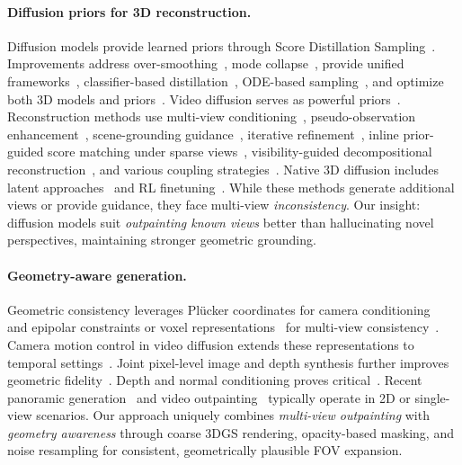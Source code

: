 \documentclass[runningheads]{llncs}
\begin{document}
\paragraph{Diffusion priors for 3D reconstruction.}
Diffusion models provide learned priors through Score Distillation Sampling~\cite{poole2022dreamfusion,wang2023prolificdreamer,liang2024luciddreamer}. Improvements address over-smoothing~\cite{lukoianov2024score}, mode collapse~\cite{wang2024taming}, provide unified frameworks~\cite{mcallister2024rethinking}, classifier-based distillation~\cite{yu2023text}, ODE-based sampling~\cite{wu2024consistent3d,lee2024dreamflow}, and optimize both 3D models and priors~\cite{yang2024learn,chen2024vividdreamer}. Video diffusion serves as powerful priors~\cite{liu2024reconx,melas20243d,yi2024gaussiandreamer}. Reconstruction methods use multi-view conditioning~\cite{wu2024reconfusion}, pseudo-observation enhancement~\cite{liu2024deceptive}, scene-grounding guidance~\cite{zhong2025taming}, iterative refinement~\cite{wu2025genfusion,wu2025difix3d+,liu20243dgs}, inline prior-guided score matching under sparse views~\cite{wang2024use}, visibility-guided decompositional reconstruction~\cite{ni2025decompositional}, and various coupling strategies~\cite{xu2024bayesian,hui2024microdiffusion,muller2024multidiff,liu2024meshformer,xue2024human}. Native 3D diffusion includes latent approaches~\cite{lan2024ln3diff,he2024gvgen,wu2024direct3d,wu2024unique3d,yang2024scenecraft} and RL finetuning~\cite{xie2024carve3d}. While these methods generate additional views or provide guidance, they face multi-view \emph{inconsistency}. Our insight: diffusion models suit \emph{outpainting known views} better than hallucinating novel perspectives, maintaining stronger geometric grounding.

\paragraph{Geometry-aware generation.}
Geometric consistency leverages Pl\"ucker coordinates for camera conditioning~\cite{xu2023dmv3d,kant2024spad,zhang2024cameras,xu2024camco,ji2025campvg,he2024cameractrl,bahmani2025vd3d} and epipolar constraints or voxel representations~\cite{tu2023imgeonet} for multi-view consistency~\cite{huang2024epidiff,ye2024diffpano,wang2024mvdd,kupyn2025epipolar,muller2024multidiff,xu20243difftection,zheng2024cami2v}. Camera motion control in video diffusion extends these representations to temporal settings~\cite{wang2024motionctrl}. Joint pixel-level image and depth synthesis further improves geometric fidelity~\cite{guizilini2025zero}. Depth and normal conditioning proves critical~\cite{lu2024direct2,long2024wonder3d,ke2024repurposing,fu2024geowizard,patni2024ecodepth,hu2024mvd,duan2024diffusiondepth,wang2024depthanywhere,qiu2024richdreamer}. Recent panoramic generation~\cite{zhang2024continuous,wang2024360dvd} and video outpainting~\cite{yu2025unboxed} typically operate in 2D or single-view scenarios. Our approach uniquely combines \emph{multi-view outpainting} with \emph{geometry awareness} through coarse 3DGS rendering, opacity-based masking, and noise resampling for consistent, geometrically plausible FOV expansion.
\end{document}
